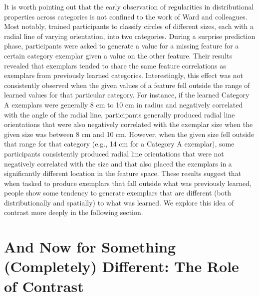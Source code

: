 \documentclass[12pt]{article}
\begin{document}
\begin{flushleft}
It is worth pointing out that the early observation of regularities in
distributional properties across categories is not confined to the work of Ward
and colleagues. Most notably, \citet{thomas98} trained participants to classify
circles of different sizes, each with a radial line of varying orientation, into
two categories. During a surprise prediction phase, participants were asked to
generate a value for a missing feature for a certain category exemplar given a
value on the other feature. Their results revealed that exemplars tended to
share the same feature correlations as exemplars from previously learned
categories. Interestingly, this effect was not consistently observed when the
given values of a feature fell outside the range of learned values for that
particular category. For instance, if the learned Category A exemplars were
generally 8 cm to 10 cm in radius and negatively correlated with the angle of
the radial line, participants generally produced radial line orientations that
were also negatively correlated with the exemplar size when the given size was
between 8 cm and 10 cm. However, when the given size fell outside that range for
that category (e.g., 14 cm for a Category A exemplar), some participants
consistently produced radial line orientations that were not negatively
correlated with the size and that also placed the exemplars in a significantly
different location in the feature space. These results suggest that when tasked
to produce exemplars that fall outside what was previously learned, people show
some tendency to generate exemplars that are different (both distributionally
and spatially) to what was learned. We explore this idea of contrast
more deeply in the following section.

\section{And Now for Something (Completely) Different: The Role of Contrast}



\end{flushleft}
\end{document}
